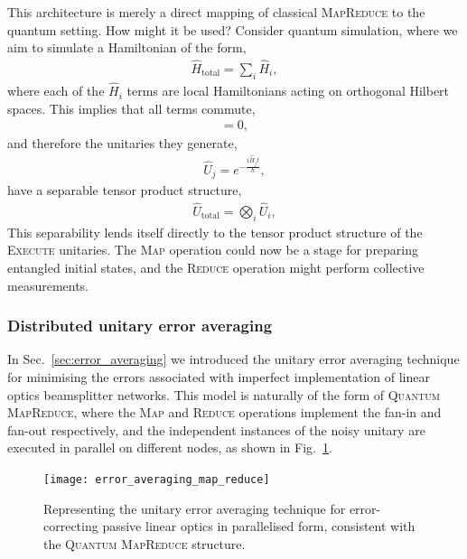 This architecture is merely a direct mapping of classical \textsc{MapReduce} to the quantum setting. How might it be used? Consider quantum simulation, where we aim to simulate a Hamiltonian of the form,
\begin{align}
\hat{H}_\mathrm{total} = \sum_i \hat{H}_i,	
\end{align}
where each of the $\hat{H}_i$ terms are local Hamiltonians acting on orthogonal Hilbert spaces. This implies that all terms commute,
\begin{align}
[\hat{H}_i,\hat{H}_j]=0,
\end{align}
and therefore the unitaries they generate,
\begin{align}
	\hat{U}_j=e^{-\frac{i\hat{H}_jt}{\hbar}},
\end{align}
have a separable tensor product structure,
\begin{align}
	\hat{U}_\mathrm{total}=\bigotimes_i \hat{U}_i,
\end{align}
This separability lends itself directly to the tensor product structure of the \textsc{Execute} unitaries. The \textsc{Map} operation could now be a stage for preparing entangled initial states, and the \textsc{Reduce} operation might perform collective measurements.

\subsubsection{Distributed unitary error averaging}\label{sec:error_av_parallel}

In Sec.~\ref{sec:error_averaging} we introduced the unitary error averaging technique for minimising the errors associated with imperfect implementation of linear optics beamsplitter networks. This model is naturally of the form of \textsc{Quantum MapReduce}, where the \textsc{Map} and \textsc{Reduce} operations implement the fan-in and fan-out respectively, and the independent instances of the noisy unitary are executed in parallel on different nodes, as shown in Fig.~\ref{fig:error_av_map_reduce}.

\begin{figure}[!htb]
	\texttt{[image: error\_averaging\_map\_reduce]}
	\captionspace \caption{Representing the unitary error averaging technique for error-correcting passive linear optics in parallelised form, consistent with the \textsc{Quantum MapReduce} structure.}\label{fig:error_av_map_reduce}
\end{figure}

